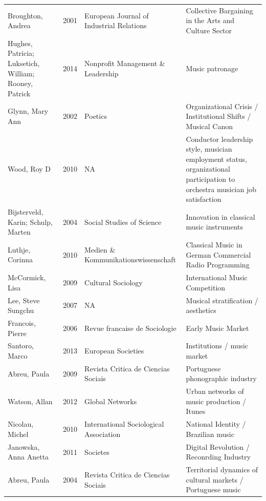\documentclass[a4paper, 12pt, openright, oneside, german, french, english, brazil]{abntex2}
\begin{document}
\begin{SingleSpace}
\begin{footnotesize}
\begin{center}
\begin{longtable}{p{4cm}lp{4cm}p{4cm}}
		Broughton, Andrea & 2001 & European Journal of Industrial Relations & Collective Bargaining in the Arts and Culture Sector\\

		Hughes, Patricia; Luksetich, William; Rooney, Patrick & 2014 & Nonprofit Management \& Leadership & Music patronage\\

		Glynn, Mary Ann & 2002 & Poetics & Organizational Crisis / Institutional Shifts / Musical Canon\\

		Wood, Roy D & 2010 & NA & Conductor leadership style, musician employment status, organizational participation to orchestra musician job satisfaction\\

		Bijsterveld, Karin; Schulp, Marten & 2004 & Social Studies of Science & Innovation in classical music instruments\\

		Luthje, Corinna & 2010 & Medien \& Kommunikationswissenschaft & Classical Music in German Commercial Radio Programming\\

		McCormick, Lisa & 2009 & Cultural Sociology & International Music Competition\\

		Lee, Steve Sungchu & 2007 & NA & Musical stratification / aesthetics\\

		Francois, Pierre & 2006 & Revue francaise de Sociologie & Early Music Market\\

		Santoro, Marco & 2013 & European Societies & Institutions / music market\\

		Abreu, Paula & 2009 & Revista Critica de Ciencias Sociais & Portuguese phonographic industry\\

		Watson, Allan & 2012 & Global Networks & Urban networks of music production / Itunes\\

		Nicolau, Michel & 2010 & International Sociological Association & National Identity / Brazilian music\\

		Janowska, Anna Anetta & 2011 & Societes & Digital Revolution / Reconrding Industry\\

		Abreu, Paula & 2004 & Revista Critica de Ciencias Sociais & Territorial dynamics of cultural markets / Portuguese music\\


\end{longtable}
\end{center}
\end{footnotesize}
\end{SingleSpace}
\end{document}
